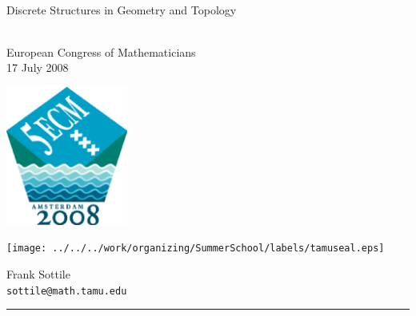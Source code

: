 \documentclass[17pt,landscape]{Narrow}
\begin{document}
\sf

\slide{}
\LogoOff
\thispagestyle{empty}

\begin{center}\rule{0pt}{40pt}
\\
\large Discrete Structures in Geometry and Topology\rule{0pt}{40pt}\\
European Congress of Mathematicians\\
17 July 2008\vspace{-10pt}


\hfill\includegraphics[width=4cm]{logo.eps}\vspace{-50pt}

\texttt{[image: ../../../work/organizing/SummerSchool/labels/tamuseal.eps]}
\begin{minipage}[b]{8cm}
Frank Sottile\\
{\small\tt sottile@math.tamu.edu}
\end{minipage}\rule{100pt}{0pt}


\end{center}

\end{document}
